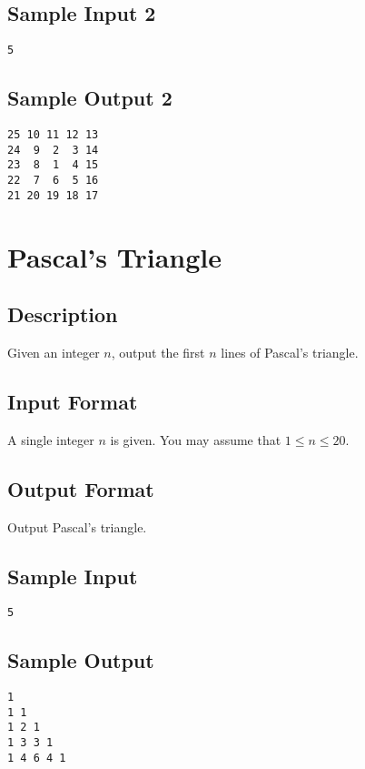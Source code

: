 \subsection*{Sample Input 2}
\begin{verbatim}
5
\end{verbatim}

\subsection*{Sample Output 2}
\begin{verbatim}
25 10 11 12 13
24  9  2  3 14
23  8  1  4 15
22  7  6  5 16
21 20 19 18 17
\end{verbatim}



\newpage



\section{Pascal's Triangle}

\subsection*{Description}
Given an integer $n$, output the first $n$ lines of Pascal's triangle.

\subsection*{Input Format}
A single integer $n$ is given. You may assume that $1 \leq n \leq 20$. 

\subsection*{Output Format}
Output Pascal's triangle.

\subsection*{Sample Input}
\begin{verbatim}
5
\end{verbatim}

\subsection*{Sample Output}
\begin{verbatim}
1
1 1
1 2 1
1 3 3 1
1 4 6 4 1
\end{verbatim}





